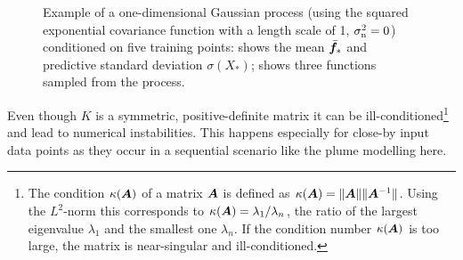 \begin{figure}
    \centering
    \caption[Gaussian process example]{Example of a one-dimensional Gaussian 
        process (using the squared exponential covariance function with 
        a length scale of 1, $\sigma_{\mathrm{n}}^2 = 0$) conditioned on five training 
        points:  shows the mean $\bar{\bm{f}_*}$ and predictive 
        standard deviation $\sigma(X_*)$;  shows three 
        functions sampled from the process.}\label{fig:ex-gp-main}
\end{figure}

Even though $K$ is a symmetric, positive-definite matrix it can be 
ill-conditioned\footnote{The condition $\kappa(\bm{A})$ of a matrix $\bm{A}$ is 
    defined as $\kappa(\bm{A}) = \|\bm{A}\| \|\bm{A}^{-1}\|$. Using the 
    $L^2$-norm this corresponds to $\kappa(\bm{A}) = \lambda_1/\lambda_n$,
    the ratio of the largest eigenvalue $\lambda_1$ and the smallest one
    $\lambda_n$. If the condition number $\kappa(\bm{A})$ is too large, the 
    matrix is near-singular and ill-conditioned.} and lead to numerical 
instabilities. This happens especially for close-by input data points as they 
occur in a sequential scenario like the plume modelling here.


